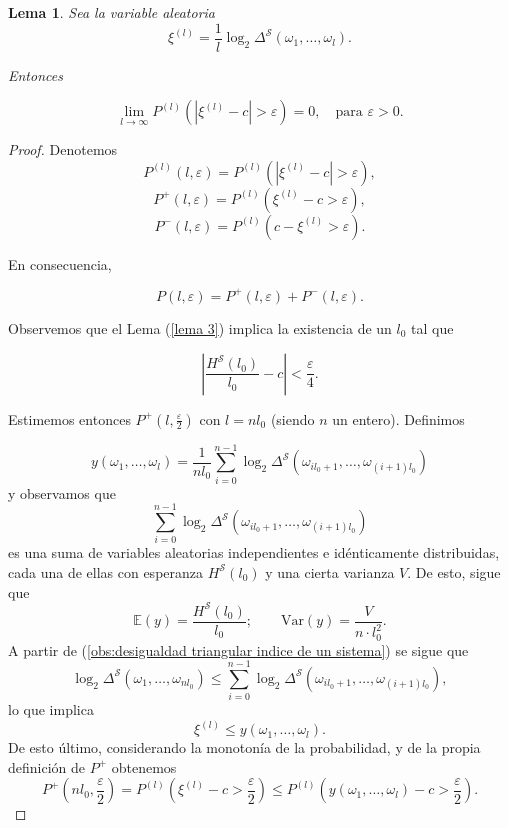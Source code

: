 \documentclass{report}
\newtheorem{lem}{Lema}[section]
\begin{document}
\bigskip
\begin{lem} \label{lema 4}
    Sea la variable aleatoria
    \[
        \xi^{(l)} = \frac{1}{l} \log_2 \Delta^{\mathcal{S}}(\omega_1, \dots, \omega_l).
    \]

    Entonces

    \[
    \lim_{l \to \infty} P^{(l)}(|\xi^{(l)} - c| > \varepsilon) = 0, \quad \text{para } \varepsilon > 0.
    \]
\end{lem}
\bigskip
\begin{proof}
    Denotemos
    \[ P^{(l)}(l, \varepsilon) = P^{(l)}(|\xi^{(l)} - c| > \varepsilon) , \]
    \[ P^+(l, \varepsilon) = P^{(l)}(\xi^{(l)} - c > \varepsilon) , \]
    \[ P^-(l, \varepsilon) = P^{(l)}(c - \xi^{(l)} > \varepsilon) . \]

    En consecuencia,

    \[
    P(l, \varepsilon) = P^+(l, \varepsilon) + P^-(l, \varepsilon).
    \]

    Observemos que el Lema (\ref{lema 3}) implica la existencia de un \( l_0 \) tal que

    \begin{equation}\label{desigualdad 14}
    \left| \frac{H^{\mathcal{S}}(l_0)}{l_0} - c \right| < \frac{\varepsilon}{4}.
    \end{equation}

    Estimemos entonces \( P^+(l, \frac{\varepsilon}{2}) \) con \( l = nl_0 \) (siendo \( n \) un entero). Definimos

    \[
    y(\omega_1,\ldots,\omega_l) = \frac{1}{nl_0} \sum_{i=0}^{n-1} \log_2 \Delta^{\mathcal{S}}(\omega_{il_0+1}, \dots, \omega_{(i+1)l_0})
    \]
    y observamos que
    \[
    \sum_{i=0}^{n-1} \log_2 \Delta^{\mathcal{S}}(\omega_{il_0+1}, \dots, \omega_{(i+1)l_0})
    \]
    es una suma de variables aleatorias independientes e idénticamente distribuidas, cada una de ellas con esperanza \( H^{\mathcal{S}}(l_0) \)
    y una cierta varianza $V$. De esto, sigue que
    \[
    \mathbb{E}(y) = \frac{H^{\mathcal{S}}(l_0)}{l_0} ; \qquad \text{Var}(y) = \frac{V}{n \cdot l_0^2}.
    \]
    A partir de (\ref{obs:desigualdad triangular indice de un sistema}) se sigue que
    \[
    \log_2 \Delta^{\mathcal{S}}(\omega_1, \dots, \omega_{nl_0}) \leq \sum_{i=0}^{n-1} \log_2 \Delta^{\mathcal{S}}(\omega_{il_0+1}, \dots, \omega_{(i+1)l_0}),
    \]
    lo que implica
    \[
    \xi^{(l)} \leq y(\omega_1,\ldots,\omega_l).
    \]
    De esto último, considerando la monotonía de la probabilidad, y de la propia definición de $P^+$ obtenemos
    \begin{equation}\label{desigualdad 15}
    P^+\left(nl_0, \frac{\varepsilon}{2}\right) = P^{(l)}\left(\xi^{(l)}-c>\frac{\varepsilon}{2}\right) \leq P^{(l)} \left(y(\omega_1,\ldots,\omega_l)-c > \frac{\varepsilon}{2}\right).
    \end{equation}


\end{proof}
\end{document}
